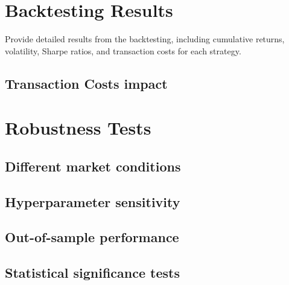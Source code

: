 \section{Backtesting Results}
Provide detailed results from the backtesting, including cumulative returns, volatility, Sharpe ratios, and transaction costs for each strategy.

\subsection{Transaction Costs impact}


\section{Robustness Tests}

\subsection{Different market conditions}

\subsection{Hyperparameter sensitivity}

\subsection{Out-of-sample performance}

\subsection{Statistical significance tests}


